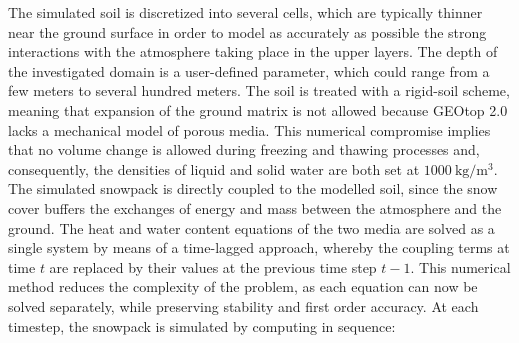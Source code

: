 The simulated soil is discretized into several cells, which are typically thinner near the ground surface in order to model as accurately as possible the 
strong interactions with the atmosphere taking place in the upper layers. The depth of the investigated domain is a user-defined parameter, which could 
range from a few meters to several hundred meters. The soil is treated with a rigid-soil scheme, meaning that expansion of the ground matrix is not 
allowed because GEOtop 2.0 lacks a mechanical model of porous media. This numerical compromise implies that no volume change is allowed 
during freezing and thawing processes and, consequently, the densities of liquid and solid water are both set at $\SI{1000}{\kilo\gram\per\meter\cubed}$. 
The simulated snowpack is directly coupled to the modelled soil, since the snow cover buffers the exchanges of energy and mass between the atmosphere and 
the ground. The heat and water content equations of the two media are solved as a single system by means of a time-lagged approach, whereby the coupling 
terms at time $t$ are replaced by their values at the previous time step $t-1$. This numerical method reduces the complexity of the problem, as each 
equation can now be solved separately, while preserving stability and first order accuracy. At each timestep, the snowpack is simulated by computing in 
sequence:

